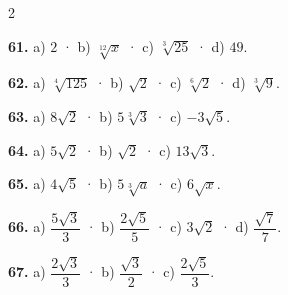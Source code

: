 \documentclass[13pt,a4paper]{extarticle}
\begin{document}
\begin{multicols}{2}
\begin{minipage}{\linewidth}
\textbf{61.} a) $2$ · b) $\sqrt[12]{x}$ · c) $\sqrt[3]{25}$ · d) $49$.\par
\end{minipage}\par\vspace{1.6mm}
\par\noindent\begin{minipage}{\linewidth}
\textbf{62.} a) $\sqrt[4]{125}$ · b) $\sqrt2$ · c) $\sqrt[6]{2}$ · d) $\sqrt[3]{9}$.\par
\end{minipage}\par\vspace{1.6mm}
\par\noindent\begin{minipage}{\linewidth}
\textbf{63.} a) $8\sqrt2$ · b) $5\sqrt[3]{3}$ · c) $-3\sqrt5$.\par
\end{minipage}\par\vspace{1.6mm}
\par\noindent\begin{minipage}{\linewidth}
\textbf{64.} a) $5\sqrt2$ · b) $\sqrt2$ · c) $13\sqrt3$.\par
\end{minipage}\par\vspace{1.6mm}
\par\noindent\begin{minipage}{\linewidth}
\textbf{65.} a) $4\sqrt5$ · b) $5\sqrt[3]{a}$ · c) $6\sqrt x$.\par
\end{minipage}\par\vspace{1.6mm}
\par\noindent\begin{minipage}{\linewidth}
\textbf{66.} a) $\dfrac{5\sqrt3}{3}$ · b) $\dfrac{2\sqrt5}{5}$ · c) $3\sqrt2$ · d) $\dfrac{\sqrt7}{7}$.\par
\end{minipage}\par\vspace{1.6mm}
\par\noindent\begin{minipage}{\linewidth}
\textbf{67.} a) $\dfrac{2\sqrt3}{3}$ · b) $\dfrac{\sqrt3}{2}$ · c) $\dfrac{2\sqrt5}{3}$.\par
\end{minipage}\par\vspace{1.6mm}

\end{multicols}
\end{document}
